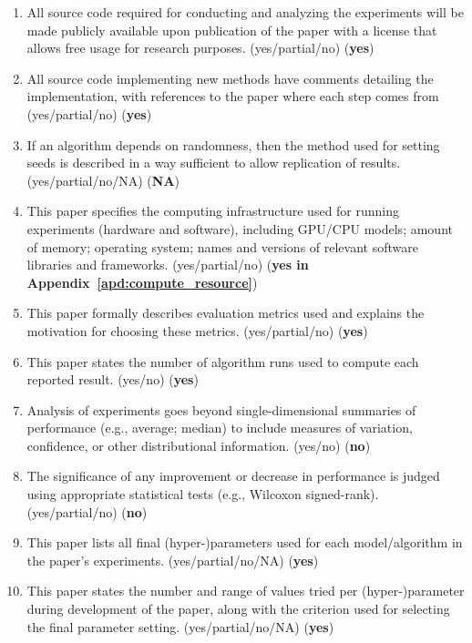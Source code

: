\begin{enumerate}
\begin{enumerate}
\begin{enumerate}
\begin{enumerate}
                \item All source code required for conducting and analyzing the experiments will be made publicly available upon publication of the paper with a license that allows free usage for research purposes. (yes/partial/no) (\textbf{yes})
                \item All source code implementing new methods have comments detailing the implementation, with references to the paper where each step comes from (yes/partial/no) (\textbf{yes})
                \item If an algorithm depends on randomness, then the method used for setting seeds is described in a way sufficient to allow replication of results. (yes/partial/no/NA) (\textbf{NA})
                \item This paper specifies the computing infrastructure used for running experiments (hardware and software), including GPU/CPU models; amount of memory; operating system; names and versions of relevant software libraries and frameworks. (yes/partial/no) (\textbf{yes in Appendix~\ref{apd:compute_resource}})
                \item This paper formally describes evaluation metrics used and explains the motivation for choosing these metrics. (yes/partial/no)  (\textbf{yes})
                \item This paper states the number of algorithm runs used to compute each reported result. (yes/no) (\textbf{yes})
                \item Analysis of experiments goes beyond single-dimensional summaries of performance (e.g., average; median) to include measures of variation, confidence, or other distributional information. (yes/no)  (\textbf{no})
                \item The significance of any improvement or decrease in performance is judged using appropriate statistical tests (e.g., Wilcoxon signed-rank). (yes/partial/no)  (\textbf{no})
                \item This paper lists all final (hyper-)parameters used for each model/algorithm in the paper’s experiments. (yes/partial/no/NA) (\textbf{yes})
                \item This paper states the number and range of values tried per (hyper-)parameter during development of the paper, along with the criterion used for selecting the final parameter setting. (yes/partial/no/NA) (\textbf{yes})
            \end{enumerate}
        \end{enumerate}
    \end{enumerate}
\end{enumerate}